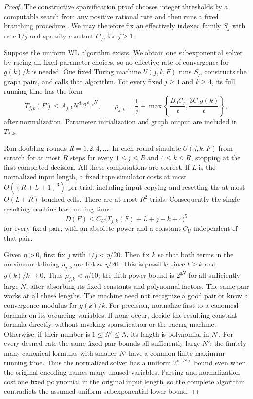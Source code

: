 \begin{proof}
The constructive sparsification proof chooses integer thresholds by
a computable search from any positive rational rate and then runs a
fixed branching procedure \citep[pp.~520--523]{IPZ2001}.
We may therefore fix an effectively indexed family \(S_j\) with rate
\(1/j\) and sparsity constant \(C_j\), for \(j\ge1\).

Suppose the uniform WL algorithm exists. We obtain one subexponential
solver by racing all fixed parameter choices, so no effective rate of
convergence for \(g(k)/k\) is needed. One fixed Turing machine
\(U(j,k,F)\) runs \(S_j\), constructs the graph pairs, and calls that
algorithm. For every fixed \(j\ge1\) and \(k\ge4\), its full running time
has the form
\[
T_{j,k}(F)\le A_{j,k}N^{d_j}2^{\rho_{j,k}N},
\qquad
\rho_{j,k}=\frac1j+
 \max\left\{\frac{B_0C_j}{t},\frac{3C_jg(k)}{t}\right\},
\]
after normalization. Parameter initialization and graph output are
included in \(T_{j,k}\).

Run doubling rounds \(R=1,2,4,\ldots\). In each round simulate \(U(j,k,F)\)
from scratch for at most \(R\) steps for every \(1\le j\le R\) and
\(4\le k\le R\), stopping at the first completed decision.
All these computations are correct. If \(L\) is the normalized input
length, a fixed tape simulator costs at most
\(O((R+L+1)^3)\) per trial, including input copying and resetting the
at most \(O(L+R)\) touched cells. There are at most \(R^2\) trials.
Consequently the single resulting machine has running time
\[
D(F)\le C_U\bigl(T_{j,k}(F)+L+j+k+4\bigr)^5
\]
for every fixed pair, with an absolute power and a constant \(C_U\)
independent of that pair.

Given \(\eta>0\), first fix \(j\) with \(1/j<\eta/20\).
Then fix \(k\) so that both terms in the maximum defining
\(\rho_{j,k}\) are below \(\eta/20\).
This is possible since \(t\ge k\) and \(g(k)/k\to0\).
Thus \(\rho_{j,k}<\eta/10\); the fifth-power bound is
\(2^{\eta N}\) for all sufficiently large \(N\), after absorbing its
fixed constants and polynomial factors. The same pair works at all
these lengths. The machine need not recognize a good pair or know a
convergence modulus for \(g(k)/k\).
For precision, normalize first to a canonical formula on its occurring
variables. If none occur, decide the resulting constant formula
directly, without invoking sparsification or the racing machine.
Otherwise, if their number is \(1\le N'\le N\), its length is polynomial
in \(N'\). For every desired rate the same fixed pair bounds all
sufficiently large \(N'\); the finitely many canonical formulas with
smaller \(N'\) have a common finite maximum running time. Thus the
normalized solver has a uniform \(2^{o(N)}\) bound even when the original
encoding names many unused variables. Parsing and normalization cost
one fixed polynomial in the original input length, so the complete
algorithm contradicts the assumed uniform subexponential lower bound.
\end{proof}

